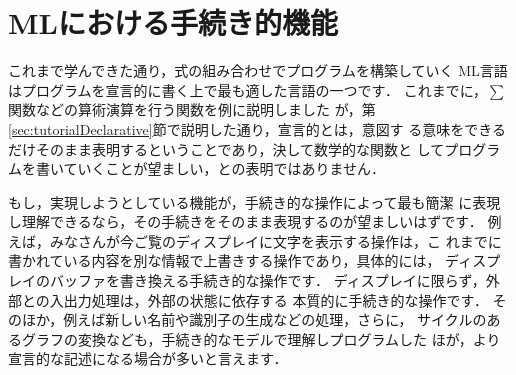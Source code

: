 \documentclass{jbook}
\newif\ifjp
\newcommand{\txt}[2]{#1}
\begin{document}
\fi%

\section{\txt{MLにおける手続き的機能}{Imperative features of ML}}
\label{sec:tutorialImperative}

\ifjp%
	これまで学んできた通り，式の組み合わせでプログラムを構築していく
ML言語はプログラムを宣言的に書く上で最も適した言語の一つです．
	これまでに，$\sum$関数などの算術演算を行う関数を例に説明しました
が，第\ref{sec:tutorialDeclarative}節で説明した通り，宣言的とは，意図す
る意味をできるだけそのまま表明するということであり，決して数学的な関数と
してプログラムを書いていくことが望ましい，との表明ではありません．

	もし，実現しようとしている機能が，手続き的な操作によって最も簡潔
に表現し理解できるなら，その手続きをそのまま表現するのが望ましいはずです．
	例えば，みなさんが今ご覧のディスプレイに文字を表示する操作は，こ
れまでに書かれている内容を別な情報で上書きする操作であり，具体的には，
ディスプレイのバッファを書き換える手続き的な操作です．
	ディスプレイに限らず，外部との入出力処理は，外部の状態に依存する
本質的に手続き的な操作です．
	そのほか，例えば新しい名前や識別子の生成などの処理，さらに，
サイクルのあるグラフの変換なども，手続き的なモデルで理解しプログラムした
ほが，より宣言的な記述になる場合が多いと言えます．
\end{document}
